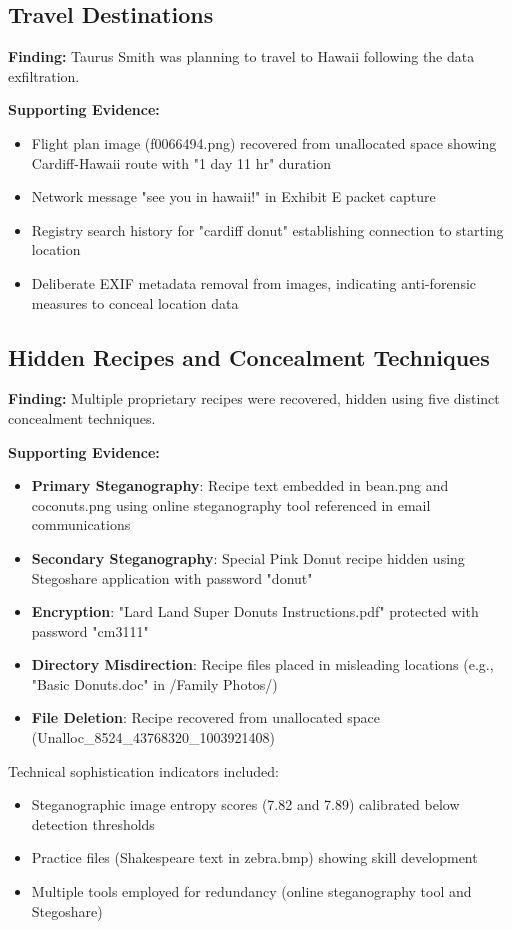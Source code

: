 \subsection{Travel Destinations}
\textbf{Finding:} Taurus Smith was planning to travel to Hawaii following the data exfiltration.

\textbf{Supporting Evidence:}
\begin{itemize}
    \item Flight plan image (f0066494.png) recovered from unallocated space showing Cardiff-Hawaii route with "1 day 11 hr" duration
    \item Network message "see you in hawaii!" in Exhibit E packet capture
    \item Registry search history for "cardiff donut" establishing connection to starting location
    \item Deliberate EXIF metadata removal from images, indicating anti-forensic measures to conceal location data
\end{itemize}

\subsection{Hidden Recipes and Concealment Techniques}
\textbf{Finding:} Multiple proprietary recipes were recovered, hidden using five distinct concealment techniques.

\textbf{Supporting Evidence:}
\begin{itemize}
    \item \textbf{Primary Steganography}: Recipe text embedded in bean.png and coconuts.png using online steganography tool referenced in email communications
    \item \textbf{Secondary Steganography}: Special Pink Donut recipe hidden using Stegoshare application with password "donut"
    \item \textbf{Encryption}: "Lard Land Super Donuts Instructions.pdf" protected with password "cm3111"
    \item \textbf{Directory Misdirection}: Recipe files placed in misleading locations (e.g., "Basic Donuts.doc" in /Family Photos/)
    \item \textbf{File Deletion}: Recipe recovered from unallocated space (Unalloc\_8524\_43768320\_1003921408)
\end{itemize}

Technical sophistication indicators included:
\begin{itemize}
    \item Steganographic image entropy scores (7.82 and 7.89) calibrated below detection thresholds
    \item Practice files (Shakespeare text in zebra.bmp) showing skill development
    \item Multiple tools employed for redundancy (online steganography tool and Stegoshare)
\end{itemize}

